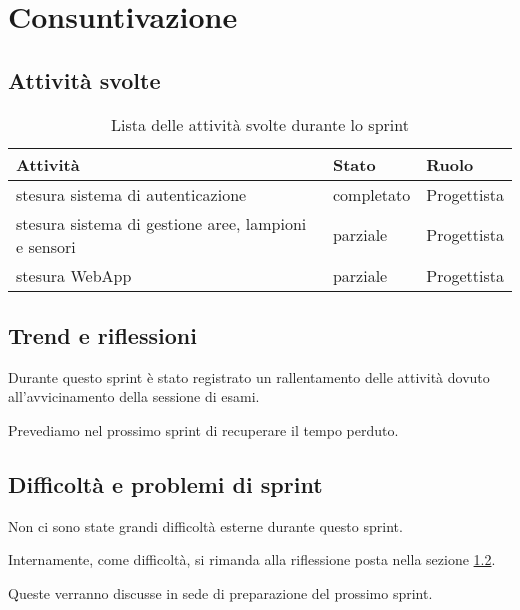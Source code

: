 \section{Consuntivazione}

\subsection{Attività svolte}

\begin{table}[H]
    \begin{xltabular}{\textwidth}{X l l}

         \textbf{Attività} & \textbf{Stato} & \textbf{Ruolo}\\
        \endhead
        \hline
        stesura sistema di autenticazione & completato & Progettista \\
        stesura sistema di gestione aree, lampioni e sensori & parziale & Progettista \\
        stesura WebApp & parziale & Progettista \\
    \end{xltabular}
    \caption{Lista delle attività svolte durante lo sprint}
\end{table}

\subsection{Trend e riflessioni}\label{subsec:trend}

Durante questo sprint è stato registrato un rallentamento delle attività dovuto all'avvicinamento della sessione di esami.

Prevediamo nel prossimo sprint di recuperare il tempo perduto.

\subsection{Difficoltà e problemi di sprint}

Non ci sono state grandi difficoltà esterne durante questo sprint.

Internamente, come difficoltà, si rimanda alla riflessione posta nella sezione \ref{subsec:trend}.

Queste verranno discusse in sede di preparazione del prossimo sprint.